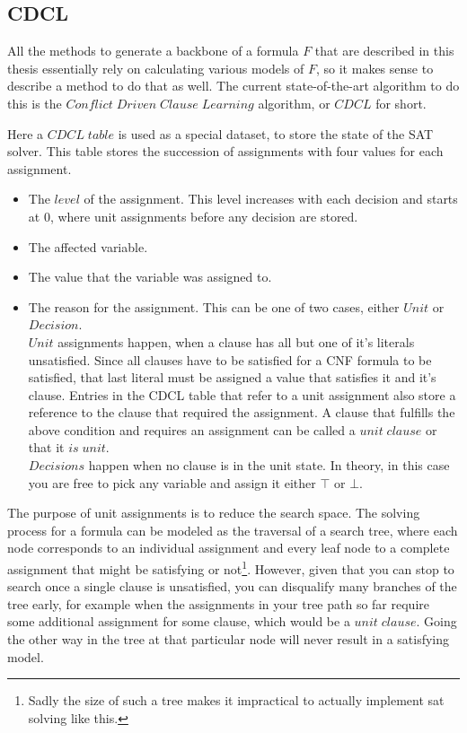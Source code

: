 \subsection{CDCL}

All the methods to generate a backbone of a formula $F$ that are described in this thesis essentially rely on calculating various models of $F$, so it makes sense to describe a method to do that as well. The current state-of-the-art algorithm to do this is the $Conflict\;Driven\;Clause\;Learning$ algorithm, or $CDCL$ for short. 

Here a $CDCL\;table$ is used as a special dataset, to store the state of the SAT solver. This table stores the succession of assignments with four values for each assignment.
\begin{itemize}
\item The $level$ of the assignment. This level increases with each decision and starts at 0, where unit assignments before any decision are stored.
\item The affected variable.
\item The value that the variable was assigned to.
\item The reason for the assignment. This can be one of two cases, either $Unit$ or $Decision$. 
\\
$Unit$ assignments happen, when a clause has all but one of it's literals unsatisfied. Since all clauses have to be satisfied for a CNF formula to be satisfied, that last literal must be assigned a value that satisfies it and it's clause. Entries in the CDCL table that refer to a unit assignment also store a reference to the clause that required the assignment. A clause that fulfills the above condition and requires an assignment can be called a $unit\; clause$ or that it $is\; unit$.
\\
$Decisions$ happen when no clause is in the unit state. In theory, in this case you are free to pick any variable and assign it either $\top$ or $\bot$. 
\end{itemize}

The purpose of unit assignments is to reduce the search space. The solving process for a formula can be modeled as the traversal of a search tree, where each node corresponds to an individual assignment and every leaf node to a complete assignment that might be satisfying or not\footnote
{
	Sadly the size of such a tree makes it impractical to actually implement sat solving like this.
}. However, given that you can stop to search once a single clause is unsatisfied, you can disqualify many branches of the tree early, for example when the assignments in your tree path so far require some additional assignment for some clause, which would be a $unit\; clause$. Going the other way in the tree at that particular node will never result in a satisfying model.

